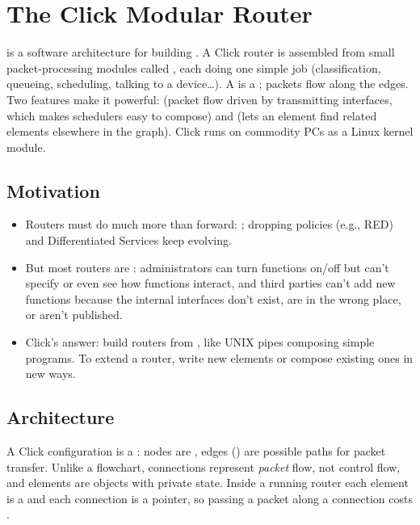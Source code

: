 \chapter{The Click Modular Router}

\begin{keybox}
 is a software architecture for building . A Click router is assembled from small packet-processing modules called , each doing one simple job (classification, queueing, scheduling, talking to a device\ldots). A  is a ; packets flow along the edges. Two features make it powerful:  (packet flow driven by transmitting interfaces, which makes schedulers easy to compose) and  (lets an element find related elements elsewhere in the graph). Click runs on commodity PCs as a Linux kernel module.
\end{keybox}

\section{Motivation}
\begin{itemize}
\item Routers must do much more than forward: ; dropping policies (e.g., RED) and Differentiated Services keep evolving.
\item But most routers are : administrators can turn functions on/off but can't specify or even see how functions interact, and third parties can't add new functions because the internal interfaces don't exist, are in the wrong place, or aren't published.
\item Click's answer: build routers from , like UNIX pipes composing simple programs. To extend a router, write new elements or compose existing ones in new ways.
\end{itemize}

\section{Architecture}
A Click configuration is a : nodes are , edges () are possible paths for packet transfer. Unlike a flowchart, connections represent \emph{packet} flow, not control flow, and elements are objects with private state. Inside a running router each element is a  and each connection is a pointer, so passing a packet along a connection costs .

